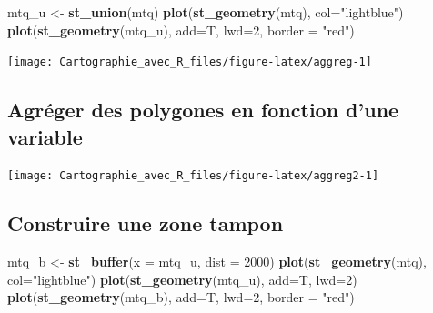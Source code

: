 \documentclass[]{book}
\newenvironment{Shaded}{\begin{snugshade}}{\end{snugshade}}
\newcommand{\KeywordTok}[1]{\textcolor[rgb]{0.13,0.29,0.53}{\textbf{#1}}}
\newcommand{\DataTypeTok}[1]{\textcolor[rgb]{0.13,0.29,0.53}{#1}}
\newcommand{\DecValTok}[1]{\textcolor[rgb]{0.00,0.00,0.81}{#1}}
\newcommand{\StringTok}[1]{\textcolor[rgb]{0.31,0.60,0.02}{#1}}
\newcommand{\OtherTok}[1]{\textcolor[rgb]{0.56,0.35,0.01}{#1}}
\newcommand{\OperatorTok}[1]{\textcolor[rgb]{0.81,0.36,0.00}{\textbf{#1}}}
\newcommand{\NormalTok}[1]{#1}
\begin{document}
\begin{Shaded}
\begin{Highlighting}[]
\NormalTok{mtq_u <-}\StringTok{ }\KeywordTok{st_union}\NormalTok{(mtq)}
\KeywordTok{plot}\NormalTok{(}\KeywordTok{st_geometry}\NormalTok{(mtq), }\DataTypeTok{col=}\StringTok{"lightblue"}\NormalTok{)}
\KeywordTok{plot}\NormalTok{(}\KeywordTok{st_geometry}\NormalTok{(mtq_u), }\DataTypeTok{add=}\NormalTok{T, }\DataTypeTok{lwd=}\DecValTok{2}\NormalTok{, }\DataTypeTok{border =} \StringTok{"red"}\NormalTok{)}
\end{Highlighting}
\end{Shaded}

\begin{center}\texttt{[image: Cartographie\_avec\_R\_files/figure-latex/aggreg-1]} \end{center}

\subsection{Agréger des polygones en fonction d'une
variable}\label{agreger-des-polygones-en-fonction-dune-variable}

\begin{Shaded}
\end{Shaded}

\begin{center}\texttt{[image: Cartographie\_avec\_R\_files/figure-latex/aggreg2-1]} \end{center}

\subsection{Construire une zone
tampon}\label{construire-une-zone-tampon}

\begin{Shaded}
\begin{Highlighting}[]
\NormalTok{mtq_b <-}\StringTok{ }\KeywordTok{st_buffer}\NormalTok{(}\DataTypeTok{x =}\NormalTok{ mtq_u, }\DataTypeTok{dist =} \DecValTok{2000}\NormalTok{)}
\KeywordTok{plot}\NormalTok{(}\KeywordTok{st_geometry}\NormalTok{(mtq), }\DataTypeTok{col=}\StringTok{"lightblue"}\NormalTok{)}
\KeywordTok{plot}\NormalTok{(}\KeywordTok{st_geometry}\NormalTok{(mtq_u), }\DataTypeTok{add=}\NormalTok{T, }\DataTypeTok{lwd=}\DecValTok{2}\NormalTok{)}
\KeywordTok{plot}\NormalTok{(}\KeywordTok{st_geometry}\NormalTok{(mtq_b), }\DataTypeTok{add=}\NormalTok{T, }\DataTypeTok{lwd=}\DecValTok{2}\NormalTok{, }\DataTypeTok{border =} \StringTok{"red"}\NormalTok{)}
\end{Highlighting}
\end{Shaded}
\end{document}
